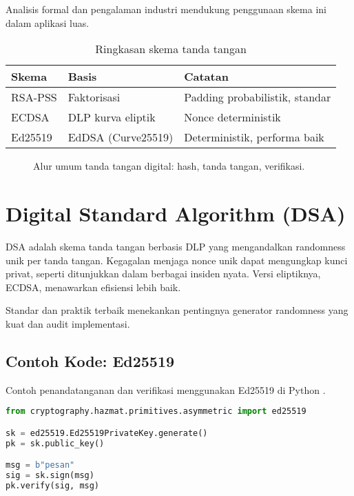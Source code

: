 \documentclass[../main.tex]{subfiles}
\begin{document}
Analisis formal dan pengalaman industri mendukung penggunaan skema ini dalam aplikasi luas.

\begin{table}[h]
\centering
\caption{Ringkasan skema tanda tangan}
\label{tab:sign-schemes}
\begin{tabular}{lll}
\toprule
Skema & Basis & Catatan \\
\midrule
RSA-PSS & Faktorisasi & Padding probabilistik, standar \parencite{rfc8017} \\
ECDSA & DLP kurva eliptik & Nonce deterministik \parencite{rfc6979} \\
Ed25519 & EdDSA (Curve25519) & Deterministik, performa baik \parencite{rfc8032} \\
\bottomrule
\end{tabular}
\end{table}

\begin{figure}[h]
\centering
{}
\caption{Alur umum tanda tangan digital: hash, tanda tangan, verifikasi.}
\label{fig:sign-verify}
\end{figure}

\section{Digital Standard Algorithm (DSA)}
DSA adalah skema tanda tangan berbasis DLP yang mengandalkan randomness unik per tanda tangan. Kegagalan menjaga nonce unik dapat mengungkap kunci privat, seperti ditunjukkan dalam berbagai insiden nyata. Versi eliptiknya, ECDSA, menawarkan efisiensi lebih baik.

Standar dan praktik terbaik menekankan pentingnya generator randomness yang kuat dan audit implementasi.

\subsection{Contoh Kode: Ed25519}
Contoh penandatanganan dan verifikasi menggunakan Ed25519 di Python \parencite{cryptography-ed25519-docs}.

\begin{lstlisting}[language=Python, caption={Ed25519 sign/verify}, label={lst:ed25519}]
from cryptography.hazmat.primitives.asymmetric import ed25519

sk = ed25519.Ed25519PrivateKey.generate()
pk = sk.public_key()

msg = b"pesan"
sig = sk.sign(msg)
pk.verify(sig, msg)
\end{lstlisting}
\end{document}
